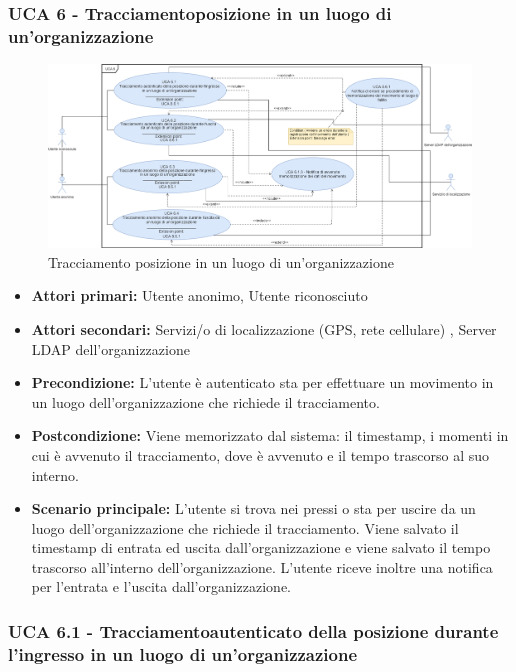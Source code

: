 \subsubsection{UCA 6 - Tracciamentoposizione in un luogo di un'organizzazione}%

\begin{figure}[h]
	\centering
	\includegraphics[scale=0.3, center]{sezioni/UseCase/Immagini/UCA6.png}
	\caption{Tracciamento posizione in un luogo di un'organizzazione}
\end{figure}

\begin{itemize}
	\item \textbf{Attori primari:} Utente anonimo, Utente riconosciuto
	\item \textbf{Attori secondari:} Servizi/o di localizzazione (GPS, rete cellulare) , Server LDAP dell'organizzazione
	\item \textbf{Precondizione:} L'utente è autenticato sta per effettuare un movimento in un luogo dell'organizzazione che richiede il tracciamento.
	\item \textbf{Postcondizione:} Viene memorizzato dal sistema: il timestamp, i momenti in cui è avvenuto il tracciamento, dove è avvenuto e il tempo trascorso al suo interno.
	\item \textbf{Scenario principale:} L'utente si trova nei pressi o sta per uscire da un luogo dell'organizzazione che richiede il tracciamento. Viene salvato il timestamp di entrata ed uscita dall'organizzazione e viene salvato il tempo trascorso all'interno dell'organizzazione. L'utente riceve inoltre una notifica per l'entrata e l'uscita dall'organizzazione.
\end{itemize}

\subsubsection{UCA 6.1 - Tracciamentoautenticato della posizione durante l'ingresso in un luogo di un'organizzazione}

